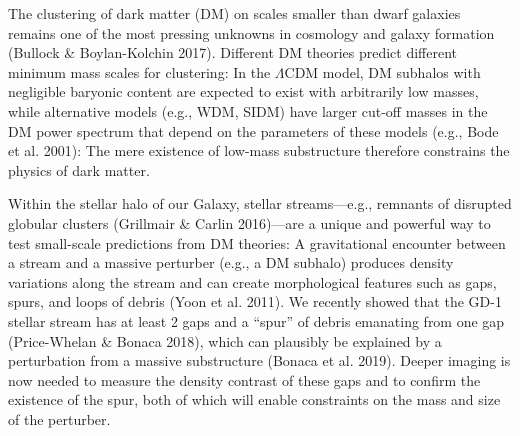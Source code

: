 \documentclass[11pt]{article}
\date{}
\author{}
\begin{document}
\maketitle

\vspace{-1em}
The clustering of dark matter (DM) on scales smaller than dwarf galaxies remains one of the most pressing unknowns in cosmology and galaxy formation (Bullock \& Boylan-Kolchin 2017).
Different DM theories predict different minimum mass scales for clustering: In the $\Lambda$CDM model, DM subhalos with negligible baryonic content are expected to exist with arbitrarily low masses, while alternative models (e.g., WDM, SIDM) have larger cut-off masses in the DM power spectrum that depend on the parameters of these models (e.g., Bode et al. 2001): The mere existence of low-mass substructure therefore constrains the physics of dark matter. %

Within the stellar halo of our Galaxy, stellar streams---e.g., remnants of disrupted globular clusters (Grillmair \& Carlin 2016)---are a unique and powerful way to test small-scale predictions from DM theories:
A gravitational encounter between a stream and a massive perturber (e.g., a DM subhalo) produces density variations along the stream and can create morphological features such as gaps, spurs, and loops of debris (Yoon et al. 2011). %
We recently showed that the GD-1 stellar stream has at least 2 gaps and a ``spur'' of debris emanating from one gap (Price-Whelan \& Bonaca 2018), which can plausibly be explained by a perturbation from a massive substructure (Bonaca et al. 2019).
Deeper imaging is now needed to measure the density contrast of these gaps and to confirm the existence of the spur, both of which will enable constraints on the mass and size of the perturber.
\end{document}
